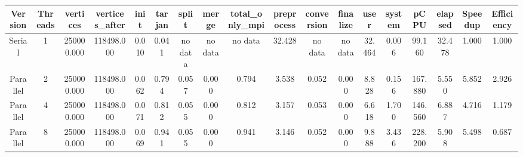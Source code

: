 \begin{tabular}{|c|c|c|c|c|c|c|c|c|c|c|c|c|c|c|c|c|c|}
\toprule
 Version &  Threads &   vertices &  vertices\_after &  init &  tarjan &   split &   merge & total\_only\_mpi &  preprocess & conversion & finalize &   user &  system &    pCPU &  elapsed &  Speedup &  Efficiency \\
\midrule
  Serial &        1 & 250000.000 &      118498.000 & 0.010 &   0.041 & no data & no data &        no data &      32.428 &    no data &  no data & 32.464 &   0.006 &  99.160 &   32.478 &    1.000 &       1.000 \\
Parallel &        2 & 250000.000 &      118498.000 & 0.062 &   0.794 &   0.057 &   0.000 &          0.794 &       3.538 &      0.052 &    0.000 &  8.828 &   0.156 & 167.880 &    5.550 &    5.852 &       2.926 \\
Parallel &        4 & 250000.000 &      118498.000 & 0.071 &   0.812 &   0.055 &   0.000 &          0.812 &       3.157 &      0.053 &    0.000 &  6.618 &   1.700 & 146.560 &    6.887 &    4.716 &       1.179 \\
Parallel &        8 & 250000.000 &      118498.000 & 0.069 &   0.941 &   0.055 &   0.000 &          0.941 &       3.146 &      0.052 &    0.000 &  9.888 &   3.436 & 228.200 &    5.908 &    5.498 &       0.687 \\
\bottomrule
\end{tabular}
